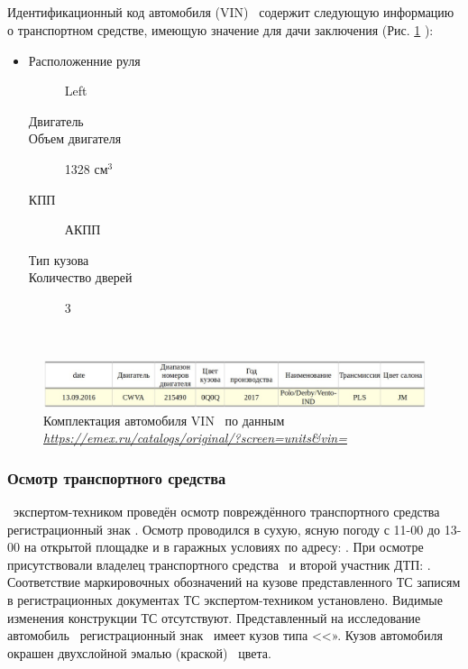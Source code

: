 	\subparagraph*{} Идентификационный код автомобиля (VIN)  \vin \, содержит следующую информацию о транспортном средстве, имеющую значение для 	дачи заключения (Рис. \ref{fig:vin} ):\\[3mm]
%	
	\noindent\parbox[]{10cm}{
		\begin{itemize}
			\item[ ] 
			\begin{description}
				\item[Расположенние руля] \hfill Left
				\item[Двигатель] \hfill {}
				\item[Объем двигателя] \hfill 1328 $ \text{см}^3 $
				\item[КПП] \hfill АКПП
				\item[Тип кузова] \hfill  {}
				\item[Количество дверей] \hfill 3 
					
			\end{description}
	\end{itemize}}\\
	
\vspace{3mm}
	

	\begin{figure}[H]
		\centering
		\includegraphics[width=0.999\linewidth]{images/vin}
		\caption[]{Комплектация автомобиля VIN \vin\, по данным\textit{ \url{https://emex.ru/catalogs/original/?screen=units\&vin=}} }
		\label{fig:vin}
	\end{figure}
	
	
	\subsubsection{Осмотр транспортного средства}
	
   \osm\, экспертом-техником проведён осмотр повреждённого транспортного средства \tc\, регистрационный знак \grz. Осмотр проводился в сухую, ясную погоду с 11-00  до 13-00 на открытой площадке и в гаражных условиях  по адресу: .   При осмотре присутствовали владелец транспортного средства \, и второй участник ДТП: . Соответствие маркировочных обозначений на кузове представленного ТС записям в регистрационных документах ТС экспертом-техником установлено. Видимые изменения конструкции ТС отсутствуют.  Представленный на исследование автомобиль \, регистрационный знак \, имеет кузов типа <<». Кузов автомобиля окрашен двухслойной   %
   эмалью (краской)  \colr \, цвета.
   
